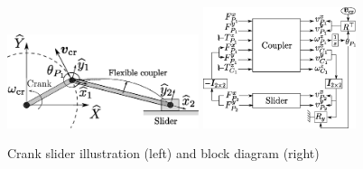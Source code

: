\documentclass{svjour3}                     %
\begin{document}
	\begin{figure}[tb]
		\centering
		\includegraphics[width=0.5\textwidth]{cr_slider.eps} 
		\includegraphics[width=0.4\textwidth]{block_crslider.eps} 
		\caption{Crank slider illustration (left) and block diagram (right)}
		\label{fig:crsl}
	\end{figure}
	
\end{document}
